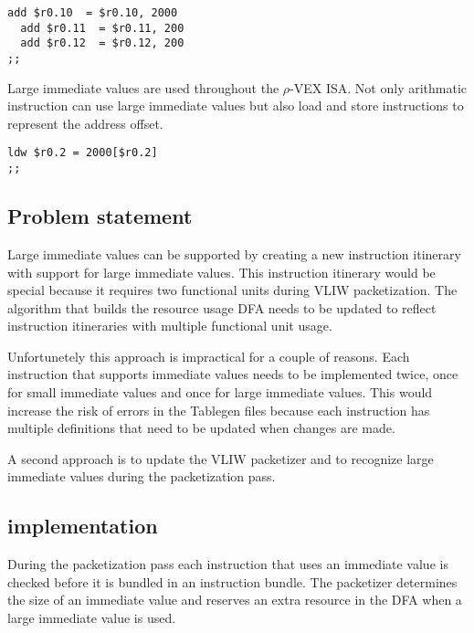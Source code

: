 \begin{lstlisting}[language=rvex]
  add $r0.10  = $r0.10, 2000
  add $r0.11  = $r0.11, 200
  add $r0.12  = $r0.12, 200
;;
\end{lstlisting}

Large immediate values are used throughout the $\rho$-VEX ISA. Not only arithmatic instruction can use large immediate values but also load and store instructions to represent the address offset.

\begin{lstlisting}[language=rvex]
  ldw $r0.2 = 2000[$r0.2]
;;
\end{lstlisting}

\subsection{Problem statement} %
\label{sub:problem_statement}
Large immediate values can be supported by creating a new instruction itinerary with support for large immediate values. This instruction itinerary would be special because it requires two functional units during VLIW packetization. The algorithm that builds the resource usage DFA needs to be updated to reflect instruction itineraries with multiple functional unit usage.

Unfortunetely this approach is impractical for a couple of reasons. Each instruction that supports immediate values needs to be implemented twice, once for small immediate values and once for large immediate values. This would increase the risk of errors in the Tablegen files because each instruction has multiple definitions that need to be updated when changes are made.

A second approach is to update the VLIW packetizer and to recognize large immediate values during the packetization pass.


\subsection{implementation} %
\label{sub:implementation}
During the packetization pass each instruction that uses an immediate value is checked before it is bundled in an instruction bundle. The packetizer determines the size of an immediate value and reserves an extra resource in the DFA when a large immediate value is used.




